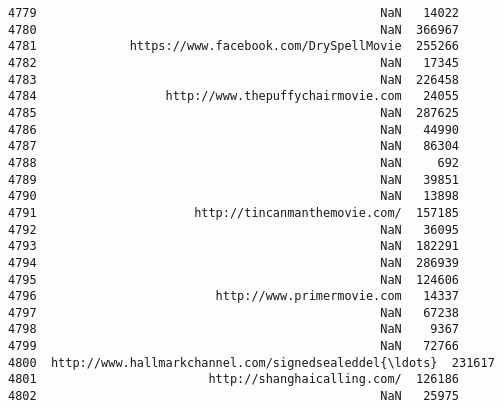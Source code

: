 \documentclass[11pt]{article}
\begin{document}
\begin{Verbatim}[commandchars=\\\{\}]
4779                                                NaN   14022   
4780                                                NaN  366967   
4781             https://www.facebook.com/DrySpellMovie  255266   
4782                                                NaN   17345   
4783                                                NaN  226458   
4784                  http://www.thepuffychairmovie.com   24055   
4785                                                NaN  287625   
4786                                                NaN   44990   
4787                                                NaN   86304   
4788                                                NaN     692   
4789                                                NaN   39851   
4790                                                NaN   13898   
4791                      http://tincanmanthemovie.com/  157185   
4792                                                NaN   36095   
4793                                                NaN  182291   
4794                                                NaN  286939   
4795                                                NaN  124606   
4796                         http://www.primermovie.com   14337   
4797                                                NaN   67238   
4798                                                NaN    9367   
4799                                                NaN   72766   
4800  http://www.hallmarkchannel.com/signedsealeddel{\ldots}  231617   
4801                        http://shanghaicalling.com/  126186   
4802                                                NaN   25975   


\end{Verbatim}
\end{document}
